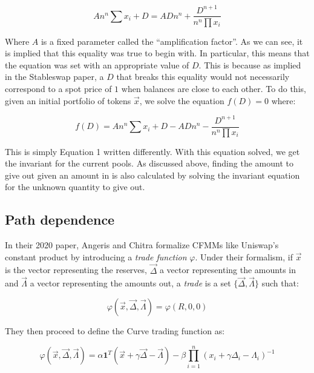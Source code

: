 \documentclass{article}
\begin{document}
    \begin{equation}
        A n^{n} \sum x_{i}+D=A D n^{n}+\frac{D^{n+1}}{n^{n} \prod x_{i}}
    \end{equation}

    Where $A$ is a fixed parameter called the ``amplification factor''. As we can see, it is implied that this equality was true to begin with. In particular, this means that the equation was set with an appropriate value of $D$. This is because as implied in the Stableswap paper, a $D$ that breaks this equality would not necessarily correspond to a spot price of $1$ when balances are close to each other. To do this, given an initial portfolio of tokens $\vec{x}$, we solve the equation $f(D) = 0$ where: 

    \begin{equation}
        f(D) = A n^{n} \sum x_{i}+D - A D n^{n} -\frac{D^{n+1}}{n^{n} \prod x_{i}}
    \end{equation}

    This is simply Equation 1 written differently. With this equation solved, we get the invariant for the current pools. As discussed above, finding the amount to give out given an amount in is also calculated by solving the invariant equation for the unknown quantity to give out. 

    \subsection{Path dependence}

    In their 2020 paper, Angeris and Chitra \cite{angeris2020} formalize CFMMs like Uniswap's constant product by introducing a \textit{trade function} $\varphi$. Under their formalism, if $\vec{x}$ is the vector representing the reserves, $\vec{\Delta}$ a vector representing the amounts in and $\vec{\Lambda}$ a vector representing the amounts out, a \textit{trade} is a set $\{\vec{\Delta}, \vec{\Lambda}\}$ such that:

    \begin{equation}
        \varphi(\vec{x}, \vec{\Delta}, \vec{\Lambda}) = \varphi(R, 0,0)
    \end{equation}

    They then proceed to define the Curve trading function as: 

    \begin{equation}
        \varphi(\vec{x}, \vec{\Delta}, \vec{\Lambda})=\alpha \mathbf{1}^{T}(\vec{x}+\gamma \vec{\Delta}-\vec{\Lambda})-\beta \prod_{i=1}^{n}\left(x_{i}+\gamma \Delta_{i}-\Lambda_{i}\right)^{-1}
    \end{equation}
\end{document}
